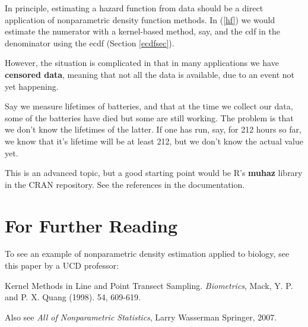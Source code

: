 In principle, estimating a hazard function from data should be a direct
application of nonparametric density function methods.  In (\ref{hf}) we
would estimate the numerator with a kernel-based method, say, and the
cdf in the denominator using the ecdf (Section \ref{ecdfsec}).

However, the situation is complicated in that in many applications we
have {\bf censored data}, meaning that not all the data is available,
due to an event not yet happening.

Say we measure lifetimes of batteries, and that at the time we collect
our data, some of the batteries have died but some are still working.
The problem is that we don't know the lifetimes of the latter.  If one
has run, say, for 212 hours so far, we know that it's lifetime will be
at least 212, but we don't know the actual value yet.

This is an advanced topic, but a good starting point would be R's {\bf
muhaz} library in the CRAN repository.  See the references in the
documentation.

\section{For Further Reading}

To see an example of nonparametric density estimation applied to
biology, see this paper by a UCD professor:

Kernel Methods in Line and Point Transect Sampling. {\it Biometrics},
Mack, Y. P. and P. X. Quang (1998).  54, 609-619. 

Also see {\it All of Nonparametric Statistics}, Larry Wasserman 
Springer, 2007.

